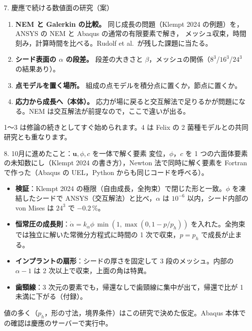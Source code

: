 \documentclass[aspectratio=169,11pt]{beamer}
\begin{document}
\begin{frame}{7. 慶應で続ける数値面の研究（案）}
\begin{enumerate}\small
  \item \textbf{NEM と Galerkin の比較。} 同じ成長の問題（Klempt 2024 の例題）を，ANSYS の NEM と Abaqus の通常の有限要素で解き，
        メッシュ収束，時間刻み，計算時間を比べる。Rudolf et al.\ が残した課題に当たる。
  \item \textbf{シード表面の $\alpha$ の段差。} 段差の大きさと $\beta$，メッシュの関係（$8^3$/$16^3$/$24^3$ の結果あり）。
  \item \textbf{点モデルを置く場所。} 組成の点モデルを積分点に置くか，節点に置くか。
  \item \textbf{応力から成長へ（本体）。} 応力が場に戻ると交互解法で足りるかが問題になる。NEM は交互解法が前提なので，ここで違いが出る。
\end{enumerate}
\vspace{4pt}
{\small 1〜3 は修論の続きとしてすぐ始められます。4 は Felix の 2 菌種モデルとの共同研究とも重なります。}
\end{frame}

\begin{frame}{8. 10月に進めたこと：$\mathbf u,\phi,c$ を一体で解く要素}
\small
変位，$\phi$，$c$ を 1 つの六面体要素の未知数にし（Klempt 2024 の書き方），Newton 法で同時に解く要素を Fortran で作った（Abaqus の UEL，Python からも同じコードを呼べる）。
\begin{itemize}
  \item \textbf{検証}：Klempt 2024 の極限（自由成長，全拘束）で閉じた形と一致。$\phi$ を凍結したシードで ANSYS（交互解法）と比べ，$\alpha$ は $10^{-6}$ 以内，シード内部の von Mises は $24^3$ で $-0.2\,\%$。
  \item \textbf{恒常圧の成長則}：$\dot\alpha=k_\alpha\phi\,\min(1,\max(0,1-p/p_h))$ を入れた。全拘束では独立に解いた常微分方程式に時間の 1 次で収束，$p=p_h$ で成長が止まる。
  \item \textbf{インプラントの扇形}：シードの厚さを固定して 3 段のメッシュ。内部の $\alpha-1$ は 2 次以上で収束，上面の角は特異。
  \item \textbf{歯頸線}：3 次元の要素でも，帰還なしで歯頸線に集中が出て，帰還で比が 1 未満に下がる（付録）。
\end{itemize}
\vspace{2pt}
{\footnotesize 値の多く（$p_h$，形の寸法，境界条件）はこの研究で決めた仮定。Abaqus 本体での確認は慶應のサーバーで実行中。}
\end{frame}
\end{document}
